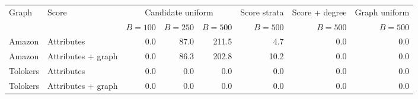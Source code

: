 \begin{tabular}{llrrrrrr}
\toprule
Graph & Score & \multicolumn{3}{c}{Candidate uniform} & Score strata & Score + degree & Graph uniform \\
 & & $B=100$ & $B=250$ & $B=500$ & $B=500$ & $B=500$ & $B=500$ \\
\midrule
Amazon & Attributes & 0.0 & 87.0 & 211.5 & 4.7 & 0.0 & 0.0 \\
Amazon & Attributes + graph & 0.0 & 86.3 & 202.8 & 10.2 & 0.0 & 0.0 \\
Tolokers & Attributes & 0.0 & 0.0 & 0.0 & 0.0 & 0.0 & 0.0 \\
Tolokers & Attributes + graph & 0.0 & 0.0 & 0.0 & 0.0 & 0.0 & 0.0 \\
\bottomrule
\end{tabular}
